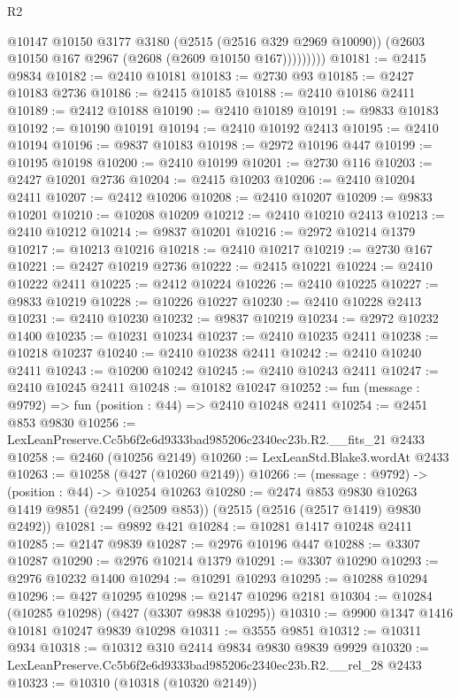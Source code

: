 \begin{lexlean}{R2}
\begin{coremodule}
              @10147
                @10150
                @3177
                @3180
                (@2515 (@2516 @329 @2969 @10090))
                (@2603 @10150 @167 @2967 (@2608 (@2609 @10150 @167)))))))))
@10181 := @2415 @9834
@10182 := @2410 @10181
@10183 := @2730 @93
@10185 := @2427 @10183 @2736
@10186 := @2415 @10185
@10188 := @2410 @10186 @2411
@10189 := @2412 @10188
@10190 := @2410 @10189
@10191 := @9833 @10183
@10192 := @10190 @10191
@10194 := @2410 @10192 @2413
@10195 := @2410 @10194
@10196 := @9837 @10183
@10198 := @2972 @10196 @447
@10199 := @10195 @10198
@10200 := @2410 @10199
@10201 := @2730 @116
@10203 := @2427 @10201 @2736
@10204 := @2415 @10203
@10206 := @2410 @10204 @2411
@10207 := @2412 @10206
@10208 := @2410 @10207
@10209 := @9833 @10201
@10210 := @10208 @10209
@10212 := @2410 @10210 @2413
@10213 := @2410 @10212
@10214 := @9837 @10201
@10216 := @2972 @10214 @1379
@10217 := @10213 @10216
@10218 := @2410 @10217
@10219 := @2730 @167
@10221 := @2427 @10219 @2736
@10222 := @2415 @10221
@10224 := @2410 @10222 @2411
@10225 := @2412 @10224
@10226 := @2410 @10225
@10227 := @9833 @10219
@10228 := @10226 @10227
@10230 := @2410 @10228 @2413
@10231 := @2410 @10230
@10232 := @9837 @10219
@10234 := @2972 @10232 @1400
@10235 := @10231 @10234
@10237 := @2410 @10235 @2411
@10238 := @10218 @10237
@10240 := @2410 @10238 @2411
@10242 := @2410 @10240 @2411
@10243 := @10200 @10242
@10245 := @2410 @10243 @2411
@10247 := @2410 @10245 @2411
@10248 := @10182 @10247
@10252 := fun (message : @9792) => fun (position : @44) => @2410 @10248 @2411
@10254 := @2451 @853 @9830
@10256 := LexLeanPreserve.Cc5b6f2e6d9333bad985206c2340ec23b.R2.__fits_21 @2433
@10258 := @2460 (@10256 @2149)
@10260 := LexLeanStd.Blake3.wordAt @2433
@10263 := @10258 (@427 (@10260 @2149))
@10266 := (message : @9792) -> (position : @44) -> @10254 @10263
@10280 := @2474
    @853
    @9830
    @10263
    @1419
    @9851
    (@2499 (@2509 @853))
    (@2515 (@2516 (@2517 @1419) @9830 @2492))
@10281 := @9892 @421
@10284 := @10281 @1417 @10248 @2411
@10285 := @2147 @9839
@10287 := @2976 @10196 @447
@10288 := @3307 @10287
@10290 := @2976 @10214 @1379
@10291 := @3307 @10290
@10293 := @2976 @10232 @1400
@10294 := @10291 @10293
@10295 := @10288 @10294
@10296 := @427 @10295
@10298 := @2147 @10296 @2181
@10304 := @10284 (@10285 @10298) (@427 (@3307 @9838 @10295))
@10310 := @9900 @1347 @1416 @10181 @10247 @9839 @10298
@10311 := @3555 @9851
@10312 := @10311 @934
@10318 := @10312 @310 @2414 @9834 @9830 @9839 @9929
@10320 := LexLeanPreserve.Cc5b6f2e6d9333bad985206c2340ec23b.R2.__rel_28 @2433
@10323 := @10310 (@10318 (@10320 @2149))

\end{coremodule}
\end{lexlean}
